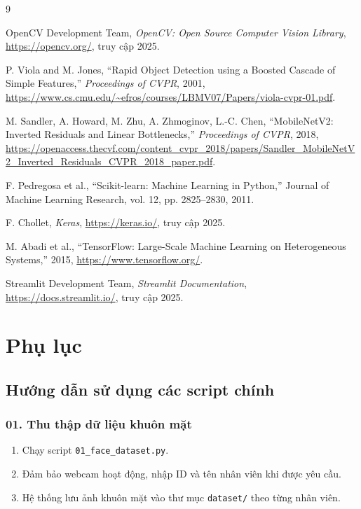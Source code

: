 \documentclass[a4paper]{book}
\begin{document}
\begin{thebibliography}{9}

 OpenCV Development Team, \emph{OpenCV: Open Source Computer Vision Library}, \url{https://opencv.org/}, truy cập 2025.

 P. Viola and M. Jones, ``Rapid Object Detection using a Boosted Cascade of Simple Features,'' \emph{Proceedings of CVPR}, 2001, \url{https://www.cs.cmu.edu/~efros/courses/LBMV07/Papers/viola-cvpr-01.pdf}.

 M. Sandler, A. Howard, M. Zhu, A. Zhmoginov, L.-C. Chen, ``MobileNetV2: Inverted Residuals and Linear Bottlenecks,'' \emph{Proceedings of CVPR}, 2018, \url{https://openaccess.thecvf.com/content_cvpr_2018/papers/Sandler_MobileNetV2_Inverted_Residuals_CVPR_2018_paper.pdf}.

F. Pedregosa et al., “Scikit-learn: Machine Learning in Python,” Journal of Machine Learning Research, vol. 12, pp. 2825–2830, 2011.

 F. Chollet, \emph{Keras}, \url{https://keras.io/}, truy cập 2025.

 M. Abadi et al., ``TensorFlow: Large-Scale Machine Learning on Heterogeneous Systems,'' 2015, \url{https://www.tensorflow.org/}.

 Streamlit Development Team, \emph{Streamlit Documentation}, \url{https://docs.streamlit.io/}, truy cập 2025.

\end{thebibliography}



\appendix
\chapter{Phụ lục}

\section{Hướng dẫn sử dụng các script chính}

\subsection*{01. Thu thập dữ liệu khuôn mặt}
\begin{enumerate}
    \item Chạy script \texttt{01\_face\_dataset.py}.
    \item Đảm bảo webcam hoạt động, nhập ID và tên nhân viên khi được yêu cầu.
    \item Hệ thống lưu ảnh khuôn mặt vào thư mục \texttt{dataset/} theo từng nhân viên.
\end{enumerate}
\end{document}
